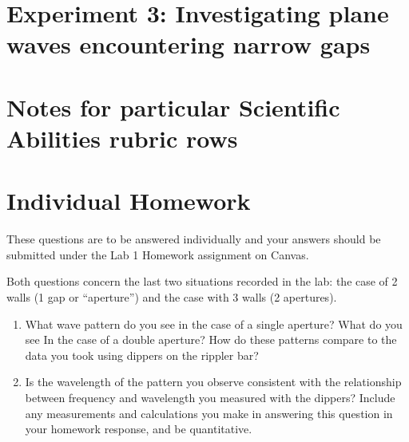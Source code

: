 \section{Experiment 3: Investigating plane waves encountering narrow gaps}



\section{Notes for particular Scientific Abilities rubric rows}



\section{Individual Homework}

These questions are to be answered individually and your answers should be submitted under the Lab 1 Homework assignment on Canvas.

Both questions concern the last two situations recorded in the lab: the case of 2 walls (1 gap or ``aperture'') and the case with 3 walls (2 apertures).

\begin{enumerate}
	\item What wave pattern do you see in the case of a single aperture? What do you see In the case of a double aperture?
	How do these patterns compare to the data you took using dippers on the rippler bar?
	
	\item Is the wavelength of the pattern you observe consistent with the relationship between frequency and wavelength you
	measured with the dippers? Include any measurements and calculations you make in answering this question in your homework response, and be quantitative.
\end{enumerate}